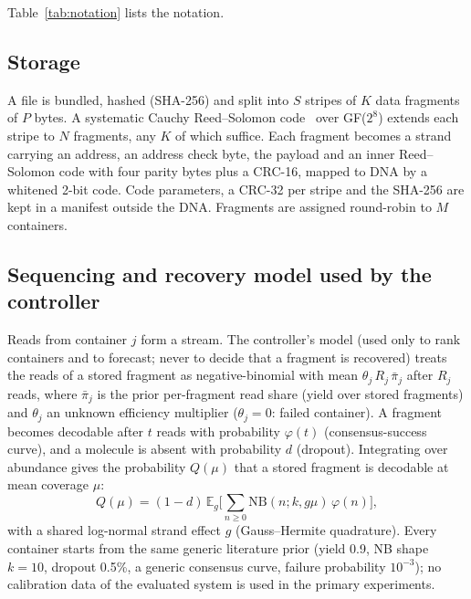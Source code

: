 \documentclass[acmsmall,screen]{acmart}
\newcommand{\E}{\mathbb{E}}
\begin{document}
Table~\ref{tab:notation} lists the notation.


\subsection{Storage}
A file is bundled, hashed (SHA-256) and split into $S$ stripes of $K$ data fragments of $P$
bytes.  A systematic Cauchy Reed--Solomon code~\cite{reed1960polynomial} over GF($2^8$) extends
each stripe to $N$ fragments, any $K$ of which suffice.  Each fragment becomes a strand carrying
an address, an address check byte, the payload and an inner Reed--Solomon code with four parity
bytes plus a CRC-16, mapped to DNA by a whitened 2-bit code.  Code parameters, a CRC-32 per
stripe and the SHA-256 are kept in a manifest outside the DNA.  Fragments are assigned
round-robin to $M$ containers.

\subsection{Sequencing and recovery model used by the controller}
Reads from container $j$ form a stream.  The controller's model (used only to rank containers
and to forecast; never to decide that a fragment is recovered) treats the reads of a stored
fragment as negative-binomial with mean $\theta_j\,R_j\,\bar\pi_j$ after $R_j$ reads, where
$\bar\pi_j$ is the prior per-fragment read share (yield over stored fragments) and $\theta_j$ an
unknown efficiency multiplier ($\theta_j{=}0$: failed container).  A fragment becomes decodable
after $t$ reads with probability $\varphi(t)$ (consensus-success curve), and a molecule is absent
with probability $d$ (dropout).  Integrating over abundance gives the probability $Q(\mu)$ that a
stored fragment is decodable at mean coverage $\mu$:
\begin{equation}
Q(\mu)=(1-d)\,\E_g\Big[\sum_{n\ge0}\mathrm{NB}(n;k,g\mu)\,\varphi(n)\Big],
\label{eq:Q}
\end{equation}
with a shared log-normal strand effect $g$ (Gauss--Hermite quadrature).  Every container starts
from the same generic literature prior (yield 0.9, NB shape $k{=}10$, dropout 0.5\%, a generic
consensus curve, failure probability $10^{-3}$); no calibration data of the evaluated system is
used in the primary experiments.
\end{document}
